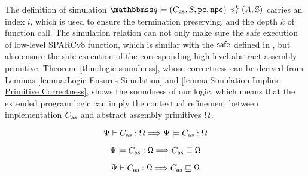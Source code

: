 The definition of simulation 
$\simFunctionSt{\relastQ}{(\asmimp, \state, \pc, \npc)}
    {i}{k}{(\primcom, \hpstate)}$ carries an index $i$, 
which is used to ensure the termination preserving, 
and the depth $k$ of function call. 
The simulation relation can not only make sure 
the safe execution of low-level SPARCv8 function, 
which is similar with the $\mathsf{safe}^{}$ defined in 
\Def{\ref{def:safety}}, but also ensure the 
safe execution of the corresponding high-level abstract 
assembly primitive. Theorem~\ref{thm:logic soundness}, 
whose correctness can be derived from Lemmas 
\ref{lemma:Logic Ensures Simulation} 
and \ref{lemma:Simulation Implies Primitive Correctness}, 
shows the soundness of our logic, 
which means that the extended program logic can 
imply the contextual refinement between implementation 
$C_{\text{as}}$ and abstract assembly primitives $\Omega$. 

\begin{lemma}
    \em
    \label{lemma:Logic Ensures Simulation}
    \[
        {\Psi} \vdash {C_{\text{as}}} : {\Omega} \Longrightarrow 
        {\Psi} \models {C_{\text{as}}} : {\Omega}
    \]
\end{lemma}

\begin{lemma}
    \em
    \label{lemma:Simulation Implies Primitive Correctness}
    \[
        {\Psi} \models {C_{\text{as}}} : {\Omega} 
        \Longrightarrow
        C_{\text{as}} \sqsubseteq \Omega
    \]
\end{lemma}

\begin{theorem}
    \em
    \label{thm:logic soundness}
    \[
        {\Psi} \vdash {C_{\text{as}}} : {\Omega} \Longrightarrow
        C_{\text{as}} \sqsubseteq \Omega
    \]
\end{theorem}